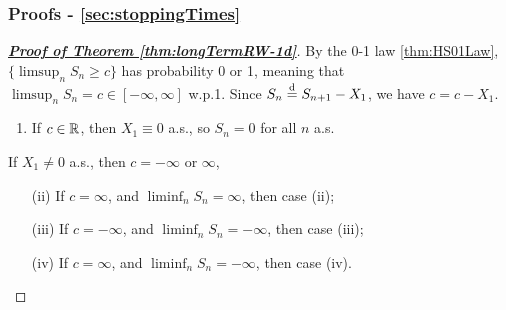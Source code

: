 \documentclass[10pt,a4paper]{article}
\begin{document}
\subsubsection{Proofs - \ref{sec:stoppingTimes}}\label{sec:proof-stoppingTimes}
\begin{proof}[\underline{\textbf{Proof of Theorem \ref{thm:longTermRW-1d}}}]
	By the 0-1 law \ref{thm:HS01Law}, $\{\limsup_n S_n\geq c\}$ has probability 0 or 1, meaning that $\limsup_n S_n=c\in [-\infty ,\infty ]$ w.p.1. Since $S_n \stackrel{\mathrm{d}}{=} S_{n+1}-X_{1}$, we have $c=c-X_1$.
\begin{enumerate}[label=(\roman*)]
	\item If $c\in\mathbb R$, then $X_1\equiv 0$ a.s., so $S_n=0$ for all $n$ a.s.
\end{enumerate}
If $X_1\neq 0$ a.s., then $c=-\infty $ or $\infty $,   
\begin{enumerate}
	\item[(ii)] If $c=\infty $, and $\liminf_n S_n=\infty $, then case (ii);
	\item[(iii)] If $c=-\infty $, and $\liminf_n S_n=-\infty $, then case (iii);
	\item[(iv)] If $c=\infty $, and $\liminf_n S_n=-\infty $, then case (iv).       
\end{enumerate}
\end{proof}
\end{document}
